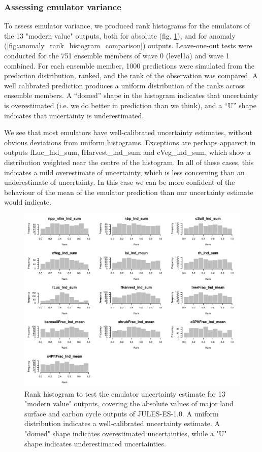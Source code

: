 \documentclass[gmd, manuscript]{copernicus}
\begin{document}
\subsubsection{Assessing emulator variance}\label{app:emulator_variance} 

To assess emulator variance, we produced rank histograms \citep{hamill2001interpretation} for the emulators of the 13 "modern value" outputs, both for absolute (fig. \ref{fig:rank_histogram_comparison}), and for anomaly (\ref{fig:anomaly_rank_histogram_comparison}) outputs. Leave-one-out tests were conducted for the 751 ensemble members of wave 0 (level1a) and wave 1 combined. For each ensemble member, 1000 predictions were simulated from the prediction distribution, ranked, and the rank of the observation was compared. A well calibrated prediction produces a uniform distribution of the ranks across ensemble members. A “domed” shape in the histogram indicates that uncertainty is overestimated (i.e. we do better in prediction than we think), and a “U” shape indicates that uncertainty is underestimated. 

We see that most emulators have well-calibrated uncertainty estimates, without obvious deviations from uniform histograms. Exceptions are perhaps apparent in outputs fLuc\_lnd\_sum, fHarvest\_lnd\_sum and cVeg\_lnd\_sum, which show a distribution weighted near the centre of the histogram. In all of these cases, this indicates a mild overestimate of uncertainty, which is less concerning than an underestimate of uncertainty. In this case we can be more confident of the behaviour of the mean of the emulator prediction than our uncertainty estimate would indicate.


\begin{figure}[ht]
\includegraphics[width=12cm]{./figs/figA04.pdf}
\caption{Rank histogram to test the emulator uncertainty estimate for 13 "modern value" outputs, covering the absolute values of major land surface and carbon cycle outputs of JULES-ES-1.0. A uniform distribution indicates a well-calibrated uncertainty estimate. A "domed" shape indicates overestimated uncertainties, while a "U" shape indicates underestimated uncertainties.}
\label{fig:rank_histogram_comparison}
\end{figure}
\end{document}
